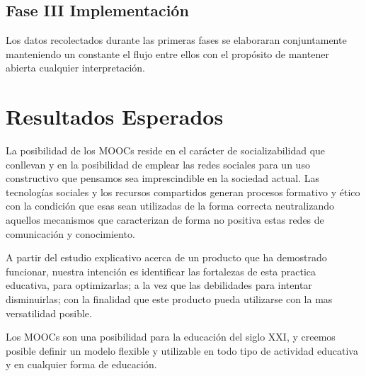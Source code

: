 \documentclass[11pt]{article}
\begin{document}
\begin{description}
\subsection {Fase III Implementación}  Los datos recolectados durante las primeras fases se elaboraran conjuntamente  manteniendo un constante  el flujo entre ellos con el propósito de mantener abierta cualquier interpretación.


\section{Resultados Esperados}

\item La posibilidad de los MOOCs reside en el carácter de socializabilidad que conllevan y en la posibilidad de emplear las redes sociales para un uso constructivo que pensamos sea imprescindible en la sociedad actual. Las tecnologías sociales y los recursos compartidos generan procesos formativo y ético con la condición que esas sean utilizadas de la forma correcta neutralizando aquellos mecanismos que caracterizan de forma no positiva estas redes de comunicación y conocimiento.

\item A partir del estudio explicativo acerca de un producto que ha demostrado funcionar, nuestra intención es identificar las fortalezas de esta practica educativa, para optimizarlas; a la vez que las debilidades para intentar disminuirlas; con la finalidad que este producto pueda utilizarse con la mas versatilidad posible. 

\item Los MOOCs son una posibilidad para la educación del siglo XXI, y creemos posible definir un modelo flexible y utilizable en todo tipo de actividad educativa y en cualquier forma de educación. 


\end{description}

\vspace{10pt}






\nocite{}
\nocite{*}

\end{document}
